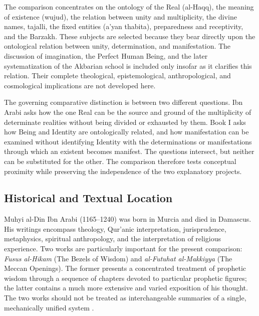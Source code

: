 \label{para:VS.B01.P01.C08.S16.SS01.P002}

The comparison concentrates on the ontology of the Real
(al-Haqq), the meaning of existence (wujud), the relation
between unity and multiplicity, the divine names, tajalli,
the fixed entities (a'yan thabita), preparedness and
receptivity, and the Barzakh. These subjects are selected
because they bear directly upon the ontological relation
between unity, determination, and manifestation. The
discussion of imagination, the Perfect Human Being, and
the later systematization of the Akbarian school is included
only insofar as it clarifies this relation. Their complete
theological, epistemological, anthropological, and cosmological
implications are not developed here.

\label{para:VS.B01.P01.C08.S16.SS01.P003}

The governing comparative distinction is between two
different questions. Ibn Arabi asks how the one Real can
be the source and ground of the multiplicity of determinate
realities without being divided or exhausted by them.
Book I asks how Being and Identity are ontologically related,
and how manifestation can be examined without identifying
Identity with the determinations or manifestations through
which an existent becomes manifest. The questions intersect,
but neither can be substituted for the other. The comparison
therefore tests conceptual proximity while preserving the
independence of the two explanatory projects.



\subsection{Historical and Textual Location}
\label{subsec:ch08_s16_ss02}

\label{para:VS.B01.P01.C08.S16.SS02.P001}

Muhyi al-Din Ibn Arabi (1165--1240) was born in Murcia
and died in Damascus. His writings encompass theology,
Qur'anic interpretation, jurisprudence, metaphysics,
spiritual anthropology, and the interpretation of religious
experience. Two works are particularly important for the
present comparison: \textit{Fusus al-Hikam} (The Bezels
of Wisdom) and \textit{al-Futuhat al-Makkiyya} (The Meccan
Openings). The former presents a concentrated treatment
of prophetic wisdom through a sequence of chapters devoted
to particular prophetic figures; the latter contains a
much more extensive and varied exposition of his thought.
The two works should not be treated as interchangeable
summaries of a single, mechanically unified system
\citep{ChittickIbnArabiSEP2025}.

